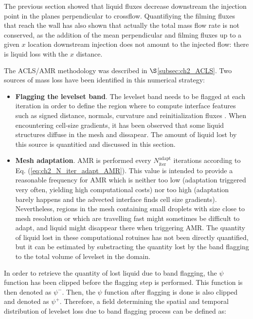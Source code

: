 The previous section showed that liquid fluxes decrease downstream the injection point in the planes perpendicular to crossflow. Quantifiying the filming fluxes that reach the wall has also shown that actually the total mass flow rate is not conserved, as the addition of the mean perpendicular and filming fluxes up to a given $x$ location downstream injection does not amount to the injected flow: there is liquid loss with the $x$ distance.

The ACLS/AMR methodology was described in $\S$\ref{subsec:ch2_ACLS}. Two sources of mass loss have been identified in this numerical strategy: 

\begin{itemize}

	\item \textbf{Flagging the levelset band}. The levelset band needs to be flagged at each iteration in order to define the region where to compute interface features such as signed distance, normals, curvature and reinitialization fluxes . When encountering cell-size gradients, it has been observed that some liquid structures diffuse in the mesh and dissapear. The amount of liquid lost by this source is quantitied and discussed in this section.
	
	\item \textbf{Mesh adaptation}. AMR is performed every $N_\mathrm{iter}^\mathrm{adapt}$ iterations according to Eq. (\ref{eq:ch2_N_iter_adapt_AMR}). This value is intended to provide a reasonable frequency for AMR which is neither too low (adaptation triggered very often, yielding high computational costs) nor too high (adaptation barely happens and the advected interface finds cell size gradients). Nevertheless, regions in the mesh containing small droplets with size close to mesh resolution or which are travelling fast might sometimes be difficult to adapt, and liquid might disappear there when triggering AMR. The quantity of liquid lost in these computational rotuines has not been directly quantified, but it can be estimated by substracting the quantity lost by the band flagging to the total volume of levelset in the domain.

\end{itemize}

In order to retrieve the quantity of lost liquid due to band flagging, the $\psi$ function has been clipped before the flagging step is performed. This function is then denoted as $\psi^-$. Then, the  $\psi$ function after flagging is done is also clipped and denoted as $\psi^+$. Therefore, a field determining the spatial and temporal distribution of levelset loss due to band flagging process can be defined as:

